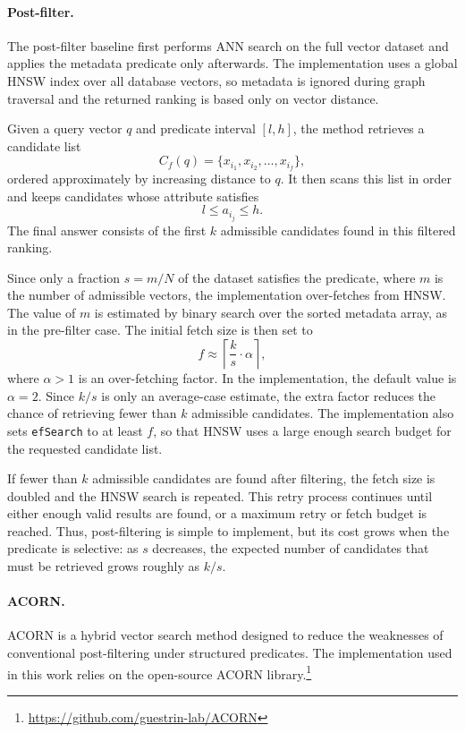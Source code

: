 \paragraph{Post-filter.}
The post-filter baseline first performs ANN search on the full vector dataset and applies the metadata predicate only afterwards.
The implementation uses a global HNSW index over all database vectors, so metadata is ignored during graph traversal and the returned ranking is based only on vector distance.

Given a query vector \(q\) and predicate interval \([l,h]\), the method retrieves a candidate list
\[
C_f(q) = \{x_{i_1}, x_{i_2}, \dots, x_{i_f}\},
\]
ordered approximately by increasing distance to \(q\).
It then scans this list in order and keeps candidates whose attribute satisfies
\[
l \le a_{i_j} \le h.
\]
The final answer consists of the first \(k\) admissible candidates found in this filtered ranking.

Since only a fraction \(s=m/N\) of the dataset satisfies the predicate, where \(m\) is the number of admissible vectors, the implementation over-fetches from HNSW.
The value of \(m\) is estimated by binary search over the sorted metadata array, as in the pre-filter case.
The initial fetch size is then set to
\[
f \approx \left\lceil \frac{k}{s} \cdot \alpha \right\rceil,
\]
where \(\alpha > 1\) is an over-fetching factor.
In the implementation, the default value is \(\alpha=2\).
Since \(k/s\) is only an average-case estimate, the extra factor reduces the chance of retrieving fewer than \(k\) admissible candidates.
The implementation also sets \texttt{efSearch} to at least \(f\), so that HNSW uses a large enough search budget for the requested candidate list.

If fewer than \(k\) admissible candidates are found after filtering, the fetch size is doubled and the HNSW search is repeated.
This retry process continues until either enough valid results are found, or a maximum retry or fetch budget is reached.
Thus, post-filtering is simple to implement, but its cost grows when the predicate is selective: as \(s\) decreases, the expected number of candidates that must be retrieved grows roughly as \(k/s\).

\paragraph{ACORN.}
ACORN is a hybrid vector search method designed to reduce the weaknesses of conventional post-filtering under structured predicates.
The implementation used in this work relies on the open-source ACORN library.\footnote{\url{https://github.com/guestrin-lab/ACORN}}

